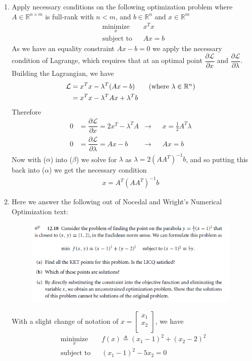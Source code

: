 \documentclass[10pt]{article}
\newcommand{\mat}[2][ccccccccccccccc]{\left [\!\!\begin{array}{#1} #2\\ \end{array} \!\!\right]}
\newcommand{\libzptrl}[2]{\dfrac{\partial #1}{\partial #2} }
\newcommand{\inv}{^{-1}}
\newcommand{\bbr}{\mathbb{R}}
\newcommand{\scl}{\mathcal{L}}
\begin{document}
\begin{enumerate}[leftmargin=*]
  \item Apply necessary conditions on the following optimization problem where $A\in\bbr^{n\times m}$ is full-rank with $n< m$, and $b\in\bbr^n$ and $x\in\bbr^m$
      \begin{equation} \label{eq:p2}
        \begin{aligned}
        & \underset{x}{\text{minimize}}
        & & x^Tx \\
        & \text{subject to}
        & & Ax=b
        \end{aligned}
      \end{equation}
      As we have an equality constraint $Ax-b=0$ we apply the necessary condition of Lagrange, which requires that at an optimal point $\libzptrl{\scl}{x}$ and $\libzptrl{\scl}{\lambda}$.  Building the Lagrangian, we have
      \begin{align*}
        \scl &= x^Tx - \lambda^T(Ax-b) \tag{where $\lambda\in\bbr^n$}\\
          &= x^Tx - \lambda^TAx + \lambda^Tb
      \end{align*}
      Therefore
      \begin{align*}
        0 &= \libzptrl{\scl}{x} = 2x^T-\lambda^TA &\rightarrow&& x=\frac{1}{2}A^T\lambda \tag{$\alpha$}\\
        0 &= \libzptrl{\scl}{\lambda} = Ax-b  &\rightarrow&& Ax=b  \tag{$\beta$}
      \end{align*}
      Now with ($\alpha$) into ($\beta$) we solve for $\lambda$ as $\lambda=2(AA^T)\inv b$, and so putting this back into ($\alpha$) we get the necessary condition
      \begin{align*}
        x = A^T(AA^T)\inv b
      \end{align*}

  \item Here we answer the following out of Nocedal and Wright's Numerical Optimization text:
                     \begin{figure}[H]
                        \centering
                        \includegraphics[width=.5\textwidth]{prob3.png}
                      \end{figure}
        With a slight change of notation of $x = \mat{x_1\\x_2}$, we have
        \begin{equation} \label{eq:p3}
        \begin{aligned}
        & \underset{x}{\text{minimize}}
        & & f(x)\triangleq(x_1 - 1)^2 + (x_2-2)^2 \\
        & \text{subject to}
        & & (x_1-1)^2-5x_2=0
        \end{aligned}
      \end{equation}



\end{enumerate}
\end{document}
